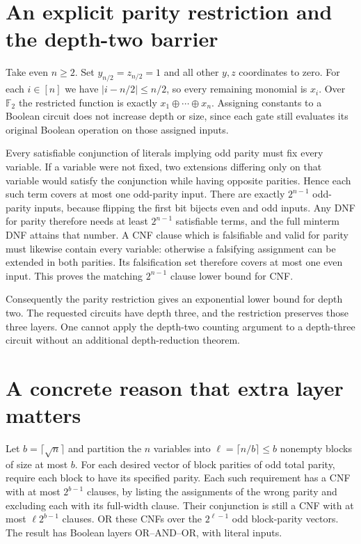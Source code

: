 \documentclass[11pt]{article}
\begin{document}
\section{An explicit parity restriction and the depth-two barrier}
Take even $n\ge2$. Set $y_{n/2}=z_{n/2}=1$ and all other $y,z$
coordinates to zero. For each $i\in[n]$ we have
$|i-n/2|\le n/2$, so every remaining monomial is $x_i$.
Over $\mathbb F_2$ the restricted function is exactly
$x_1\oplus\cdots\oplus x_n$. Assigning constants to a Boolean circuit
does not increase depth or size, since each gate still evaluates its
original Boolean operation on those assigned inputs.

Every satisfiable conjunction of literals implying odd parity must fix
every variable. If a variable were not fixed, two extensions differing
only on that variable would satisfy the conjunction while having
opposite parities. Hence each such term covers at most one odd-parity
input. There are exactly $2^{n-1}$ odd-parity inputs, because flipping
the first bit bijects even and odd inputs. Any DNF for parity therefore
needs at least $2^{n-1}$ satisfiable terms, and the full minterm DNF
attains that number. A CNF clause which is falsifiable and valid for
parity must likewise contain every variable: otherwise a falsifying
assignment can be extended in both parities. Its falsification set
therefore covers at most one even input. This proves the matching
$2^{n-1}$ clause lower bound for CNF.

Consequently the parity restriction gives an exponential lower bound
for depth two. The requested circuits have depth three, and the
restriction preserves those three layers. One cannot apply the
depth-two counting argument to a depth-three circuit without an
additional depth-reduction theorem.

\section{A concrete reason that extra layer matters}
Let $b=\lceil\sqrt n\rceil$ and partition the $n$ variables into
$\ell=\lceil n/b\rceil\le b$ nonempty blocks of size at most $b$.
For each desired vector of block parities of odd total parity, require
each block to have its specified parity. Each such requirement has a
CNF with at most $2^{b-1}$ clauses, by listing the assignments of the
wrong parity and excluding each with its full-width clause. Their
conjunction is still a CNF with at most $\ell2^{b-1}$ clauses.
OR these CNFs over the $2^{\ell-1}$ odd block-parity vectors.
The result has Boolean layers OR--AND--OR, with literal inputs.
\end{document}
